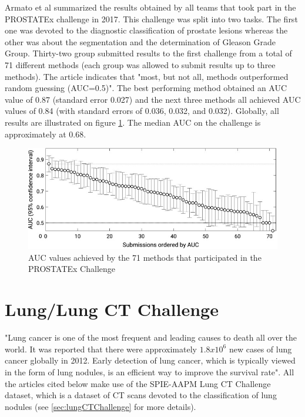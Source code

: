 Armato et al \cite{42} summarized the results obtained by all teams that took part in the PROSTATEx challenge in 2017. This challenge was split into two tasks. The first one was devoted to the diagnostic classification of prostate lesions whereas the other was about the segmentation and the determination of Gleason Grade Group. Thirty-two group submitted results to the first challenge from a total of 71 different methods (each group was allowed to submit results up to three methods). The article indicates that "most, but not all, methods outperformed random guessing (AUC=0.5)"\cite{41}. The best performing method obtained an AUC value of 0.87 (standard error 0.027) and the next three methods all achieved AUC values of 0.84 (with standard errors of 0.036, 0.032, and 0.032). Globally, all results are illustrated on figure \ref{fig:challenge_all_results}. The median AUC on the challenge is approximately at 0.68.
\begin{figure}[!h]
\centering
\includegraphics[width=1\textwidth, keepaspectratio=true]{./figures/challenge_all_results.png}
\caption{AUC values achieved by the 71 methods that participated in the PROSTATEx Challenge }
\label{fig:challenge_all_results}
\end{figure}


\section{Lung/Lung CT Challenge}
"Lung cancer is one of the most frequent and leading causes to death all over the world. It was reported that there were approximately $1.8x10^6$ new cases of lung cancer globally in 2012. Early detection of lung cancer, which is typically viewed in the form of lung nodules, is an efficient way to improve the survival rate"\cite{41}. All the articles cited below make use of the SPIE-AAPM Lung CT Challenge dataset, which is a dataset of CT scans devoted to the classification of lung nodules (see \ref{sec:lungCTChallenge} for more details).

